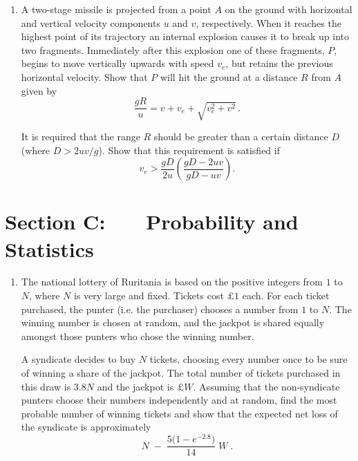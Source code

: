 \documentclass[a4, 11pt]{report}
\newlength{\qspace}
\newcounter{qnumber}
\newenvironment{question}%
 {\vspace{\qspace}
  \begin{enumerate}[\bfseries 1\quad][10]%
    \setcounter{enumi}{\value{qnumber}}%
    \item%
 }
{
  \end{enumerate}
  \filbreak
  \stepcounter{qnumber}
 }
\begin{document}

\begin{question}
A two-stage missile is projected from a point $A$
on the ground with horizontal and vertical velocity components
$u$ and $v$, respectively. When it reaches the highest point of
its trajectory an internal explosion causes it to break up into 
two fragments. Immediately after this explosion one of these 
fragments, $P$, begins to move vertically upwards with speed
$v_e$, but retains the  previous horizontal velocity. Show that
$P$ will hit the ground at a distance $R$ from $A$ given by 
$$
\frac{gR}u = v+v_e + \sqrt{v_e^2 +v^2}\, .
$$

It is required that the range $R$ should be greater than
a certain distance $D$ (where $D> 2uv/g$). Show that this requirement is satisfied
if 
\[
v_e> \frac{gD}{2u}\left( \frac{gD-2uv}{gD-uv}\right).
\] 

\end{question}
	

	
	\newpage
\section*{Section C: \ \ \ Probability and Statistics}


\begin{question}
The national lottery of Ruritania is based on the positive integers from $1$ to $N$,
where $N$ is very large and fixed. Tickets cost $\pounds1$ each.
For each ticket purchased, the punter (i.e. the purchaser)
chooses a number from  $1$ to $N$. The winning number 
 is chosen at random, and the jackpot is shared equally 
amongst those punters who chose the winning number. 

A syndicate decides to buy $N$ tickets, 
choosing every number once to be sure of winning a share of 
the jackpot. The total number of tickets purchased in this draw is $3.8N$ and 
the jackpot is   $\pounds W$. Assuming that the non-syndicate punters
choose their numbers independently and at random,
find the most probable number of 
winning tickets and show that the expected net loss of the syndicate is
approximately 
\[
N\; - \;
\frac{5
 \big(1- e^{-2.8}\big)}{14} \;W\;.
\]

\end{question}
\end{document}
